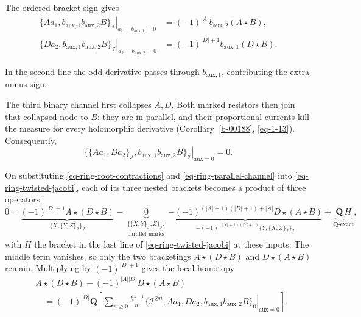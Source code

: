 \documentclass[11pt]{article}
\numberwithin{equation}{section}
\numberwithin{figure}{section}
\numberwithin{table}{section}
\begin{document}
The ordered-bracket sign gives
\begin{equation}\label{eq-ring-root-contractions}
\begin{aligned}
\left.\{Aa_1,b_{\mathrm{aux},1}b_{\mathrm{aux},2}B\}_{\mathcal I}
\right|_{a_1=b_{\mathrm{aux},1}=0}
&=(-1)^{|A|}b_{\mathrm{aux},2}(A\star B),\\
\left.\{Da_2,b_{\mathrm{aux},1}b_{\mathrm{aux},2}B\}_{\mathcal I}
\right|_{a_2=b_{\mathrm{aux},2}=0}
&=(-1)^{|D|+1}b_{\mathrm{aux},1}(D\star B).
\end{aligned}
\end{equation}

In the second line the odd derivative passes through $b_{\mathrm{aux},1}$, contributing the extra minus sign.

The third binary channel first collapses $A,D$. Both marked resistors then join that collapsed node to $B$: they are in parallel, and their proportional currents kill the measure for every holomorphic derivative (Corollary~\ref{b-00188}, \eqref{eq-1-13}). Consequently,
\begin{equation}\label{eq-ring-parallel-channel}
\left.
\{\{Aa_1,Da_2\}_{\mathcal I},
b_{\mathrm{aux},1}b_{\mathrm{aux},2}B\}_{\mathcal I}
\right|_{\mathrm{aux}=0}=0.
\end{equation}

On substituting \eqref{eq-ring-root-contractions} and \eqref{eq-ring-parallel-channel} into \eqref{eq-ring-twisted-jacobi}, each of its three nested brackets becomes a product of three operators:
\begin{equation}\label{eq-ring-twisted-jacobi-substituted}
0=\underbrace{(-1)^{|D|+1}A\star(D\star B)}_{\{X,\{Y,Z\}_{\mathcal I}\}_{\mathcal I}}
-\underbrace{0}_{\substack{\{\{X,Y\}_{\mathcal I},Z\}_{\mathcal I}:\\\text{parallel marks}}}
\underbrace{-(-1)^{(|A|+1)(|D|+1)+|A|}D\star(A\star B)}_{-(-1)^{(|X|+1)(|Y|+1)}\{Y,\{X,Z\}_{\mathcal I}\}_{\mathcal I}}
+\underbrace{\mathbf Q\,H}_{\mathbf Q\text{-exact}},
\end{equation}
with $H$ the bracket in the last line of \eqref{eq-ring-twisted-jacobi} at these inputs. The middle term vanishes, so only the two bracketings $A\star(D\star B)$ and $D\star(A\star B)$ remain. Multiplying by $(-1)^{|D|+1}$ gives the local homotopy
\begin{equation}\label{eq-ring-common-root-homotopy}
\begin{aligned}
&A\star(D\star B)-(-1)^{|A||D|}D\star(A\star B)\\
&\quad=(-1)^{|D|}\mathbf Q
\left[
\left.\sum_{n\ge0}\frac{\hbar^{n+1}}{n!}
\{\mathcal I^{\otimes n},Aa_1,Da_2,
 b_{\mathrm{aux},1}b_{\mathrm{aux},2}B\}_0
\right|_{\mathrm{aux}=0}\right].
\end{aligned}
\end{equation}
\end{document}

